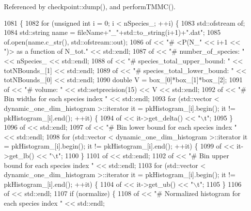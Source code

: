 Referenced by checkpoint\-::dump(), and perform\-T\-M\-M\-C().


\begin{DoxyCode}
1081                                                                                 \{
1082     \textcolor{keywordflow}{for} (\textcolor{keywordtype}{unsigned} \textcolor{keywordtype}{int} i = 0; i < nSpecies\_; ++i) \{
1083         std::ofstream of;
1084         std::string name = fileName+\textcolor{stringliteral}{"\_"}+std::to\_string(i+1)+\textcolor{stringliteral}{".dat"};
1085         of.open(name.c\_str(), std::ofstream::out);
1086         of << \textcolor{stringliteral}{"# <P(N\_"} << i+1 << \textcolor{stringliteral}{")> as a function of N\_tot."} << std::endl;
1087         of << \textcolor{stringliteral}{"# number\_of\_species: "} << nSpecies\_ << std::endl;
1088         of << \textcolor{stringliteral}{"# species\_total\_upper\_bound: "} << totNBounds\_[1] << std::endl;
1089         of << \textcolor{stringliteral}{"# species\_total\_lower\_bound: "} << totNBounds\_[0] << std::endl;
1090         \textcolor{keywordtype}{double} V = box\_[0]*box\_[1]*box\_[2];
1091         of << \textcolor{stringliteral}{"# volume: "} << std::setprecision(15) << V << std::endl;
1092         of << \textcolor{stringliteral}{"# Bin widths for each species index "} << std::endl;
1093         \textcolor{keywordflow}{for} (std::vector < dynamic\_one\_dim\_histogram >::iterator it = pkHistogram\_[i].begin(); it != 
      pkHistogram\_[i].end(); ++it) \{
1094             of << it->get\_delta() << \textcolor{stringliteral}{"\(\backslash\)t"};
1095         \}
1096         of << std::endl;
1097         of << \textcolor{stringliteral}{"# Bin lower bound for each species index "} << std::endl;
1098         \textcolor{keywordflow}{for} (std::vector < dynamic\_one\_dim\_histogram >::iterator it = pkHistogram\_[i].begin(); it != 
      pkHistogram\_[i].end(); ++it) \{
1099             of << it->get\_lb() << \textcolor{stringliteral}{"\(\backslash\)t"};
1100         \}
1101         of << std::endl;
1102         of << \textcolor{stringliteral}{"# Bin upper bound for each species index "} << std::endl;
1103         \textcolor{keywordflow}{for} (std::vector < dynamic\_one\_dim\_histogram >::iterator it = pkHistogram\_[i].begin(); it != 
      pkHistogram\_[i].end(); ++it) \{
1104             of << it->get\_ub() << \textcolor{stringliteral}{"\(\backslash\)t"};
1105         \}
1106         of << std::endl;
1107         \textcolor{keywordflow}{if} (normalize) \{
1108             of << \textcolor{stringliteral}{"# Normalized histogram for each species index "} << std::endl;

\end{DoxyCode}
